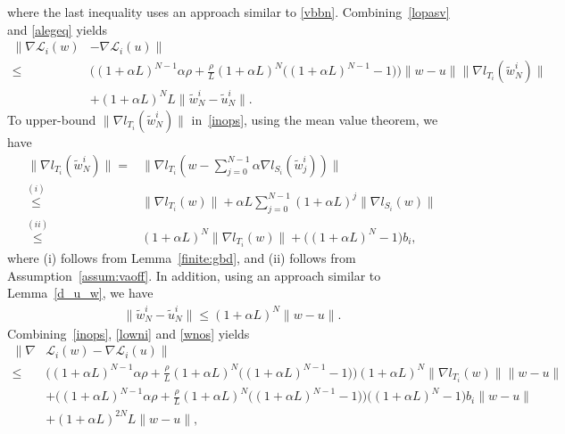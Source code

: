 \documentclass{osudissert96}
\begin{document}
	where the last inequality uses an approach similar to \cref{vbbn}. 
	Combining~\cref{lopasv} and \cref{alegeq} yields
	\begin{align}\label{inops}
	\|\nabla \mathcal{L}_i(w) & -\nabla \mathcal{L}_i(u) \| \nonumber
\\	 \leq& \big(   (1+\alpha  L)^{N-1}\alpha \rho  + \frac{\rho}{L} (1+\alpha L)^N \big( (1+\alpha L)^{N-1} -1 \big)\big)\|w-u\|  \|\nabla l_{T_i}(\widetilde w_{N}^i)\| \nonumber
	\\ &+ (1+\alpha L)^NL \|\widetilde w_{N}^i- \widetilde u_{N}^i\|.
	\end{align}
	To upper-bound $ \|\nabla l_{T_i}(\widetilde w_{N}^i)\| $ in~\cref{inops},  using the mean value theorem, we have
	\begin{align}\label{lowni}
	\|\nabla l_{T_i}(\widetilde w_{N}^i)\|  = &  \Big\|\nabla l_{T_i} (w-\sum_{j=0}^{N-1}\alpha \nabla l_{S_i}(\widetilde w_j^i))\Big\|\nonumber
	\\ \overset{(i)}\leq & \|\nabla l_{T_i} (w)\| + \alpha L \sum_{j=0}^{N-1} (1+\alpha L)^j\big\| \nabla l_{S_i}(w)   \big\| \nonumber
	\\ \overset{(ii)}\leq & (1+\alpha L)^N  \|\nabla l_{T_i} (w)\|  + \big( (1+\alpha L)^N-1 \big)b_i,
	\end{align}
	where (i) follows from Lemma~\ref{finite:gbd}, and (ii) follows from Assumption~\ref{assum:vaoff}. In addition, using an approach similar to Lemma~\ref{d_u_w}, we have
	\begin{align}\label{wnos}
	\|\widetilde w_{N}^i- \widetilde u_{N}^i\| \leq (1+\alpha L)^N \|w-u\|.
	\end{align}
	Combining~\cref{inops}, \cref{lowni} and \cref{wnos} yields
	{\small \begin{align*}
	\|\nabla &\mathcal{L}_i(w)  -\nabla \mathcal{L}_i(u) \| 
	\\ \leq& \Big(   (1+\alpha  L)^{N-1}\alpha \rho  + \frac{\rho}{L} (1+\alpha L)^N \big( (1+\alpha L)^{N-1} -1 \big)\Big)(1+\alpha L)^N \|\nabla l_{T_i} (w)\|\|w-u\| \nonumber
	\\&+ \Big(   (1+\alpha  L)^{N-1}\alpha \rho  + \frac{\rho}{L} (1+\alpha L)^N \big( (1+\alpha L)^{N-1} -1 \big)\Big)\big( (1+\alpha L)^N-1 \big)b_i\|w-u\| \nonumber
	\\ &+ (1+\alpha L)^{2N}L \|w- u\|,
	\end{align*}}
\end{document}
